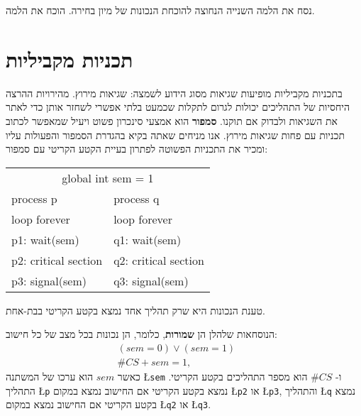 \begin{exercise}
נסח את הלמה השנייה הנחוצה להוכחת הנכונות של מיון בחירה. הוכח את הלמה.
\end{exercise}


\section{%
תכניות מקביליות%
}

בתכניות מקביליות מופיעות שגיאות מסוג הידוע לשמצה: שגיאות מירוץ. מהירויות ההרצה היחסיות של התהליכים יכולות לגרום לתקלות שכמעט בלתי אפשרי לשחזר אותן כדי לאתר את השגיאות ולבדוק אם תוקנו.
\textbf{סמפור}
הוא אמצעי סינכרון פשוט ויעיל שמאפשר לכתוב תכניות עם פחות שגיאות מירוץ. אנו מניחים שאתה בקיא בהגדרת הסמפור והפעולות עליו ומכיר את התכניות הפשוטה לפתרון בעיית הקטע הקריטי עם סמפור:

\begin{center}
\begin{ttfamily}
\begin{tabular}{ll}
\multicolumn{2}{c}{global int sem = 1}\\
process p     & process q\\
\hspace*{2em}loop forever   & \hspace*{2em} loop forever\\
\hspace*{4em}p1: wait(sem)   &  \hspace*{4em}  q1: wait(sem)\\
\hspace*{4em}p2: critical section & \hspace*{4em} q2: critical section\\
\hspace*{4em}p3: signal(sem)  &\hspace*{4em}  q3: signal(sem)
\end{tabular}
\end{ttfamily}
\end{center}

טענת הנכונות היא שרק תהליך אחד נמצא בקטע הקריטי בבת-אחת.

הנוסחאות שלהלן הן
\textbf{שמורות},
כלומר, הן נכונות בכל מצב של כל חישוב:
\begin{eqnarray}
(\mathit{sem} = 0) \vee (\mathit{sem} = 1)&&\label{eq.sem01}\\
\#\mathit{CS} + \mathit{sem} = 1,&&\label{eq.sem}
\end{eqnarray}
כאשר
$\mathit{sem}$
הוא ערכו של המשתנה
\L{\texttt{sem}}
ו-%
$\#\mathit{CS}$
הוא מספר התהליכים בקטע הקריטי. התהליך 
\L{\texttt{p}}
נמצא בקטע הקריטי אם החישוב נמצא במקום
\L{\texttt{p2}}
או
\L{\texttt{p3}},
והתהליך
\L{\texttt{q}}
נמצא בקטע הקריטי אם החישוב נמצא במקום
\L{\texttt{q2}}
או
\L{\texttt{q3}}.

